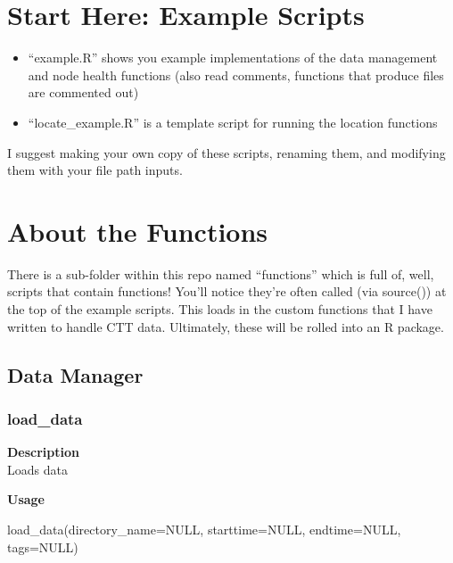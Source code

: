 \documentclass[
]{book}
\newenvironment{Shaded}{\begin{snugshade}}{\end{snugshade}}
\newcommand{\AttributeTok}[1]{\textcolor[rgb]{0.77,0.63,0.00}{#1}}
\newcommand{\ConstantTok}[1]{\textcolor[rgb]{0.00,0.00,0.00}{#1}}
\newcommand{\FunctionTok}[1]{\textcolor[rgb]{0.00,0.00,0.00}{#1}}
\newcommand{\NormalTok}[1]{#1}
\providecommand{\tightlist}{%
  \setlength{\itemsep}{0pt}\setlength{\parskip}{0pt}}
\begin{document}
\hypertarget{start-here-example-scripts}{%
\chapter{Start Here: Example Scripts}\label{start-here-example-scripts}}

\begin{itemize}
\tightlist
\item
  ``example.R'' shows you example implementations of the data management and node health functions (also read comments, functions that produce files are commented out)
\item
  ``locate\_example.R'' is a template script for running the location functions
\end{itemize}

I suggest making your own copy of these scripts, renaming them, and modifying them with your file path inputs.

\hypertarget{about-the-functions}{%
\chapter{About the Functions}\label{about-the-functions}}

There is a sub-folder within this repo named ``functions'' which is full of, well, scripts that contain functions! You'll notice they're often called (via source()) at the top of the example scripts. This loads in the custom functions that I have written to handle CTT data. Ultimately, these will be rolled into an R package.

\hypertarget{data-manager}{%
\section{Data Manager}\label{data-manager}}

\hypertarget{load_data}{%
\subsection{load\_data}\label{load_data}}

\textbf{Description}\\
Loads data

\textbf{Usage}

\begin{Shaded}
\begin{Highlighting}[]
\FunctionTok{load\_data}\NormalTok{(}\AttributeTok{directory\_name=}\ConstantTok{NULL}\NormalTok{, }\AttributeTok{starttime=}\ConstantTok{NULL}\NormalTok{, }\AttributeTok{endtime=}\ConstantTok{NULL}\NormalTok{, }\AttributeTok{tags=}\ConstantTok{NULL}\NormalTok{)  }
\end{Highlighting}
\end{Shaded}
\end{document}
